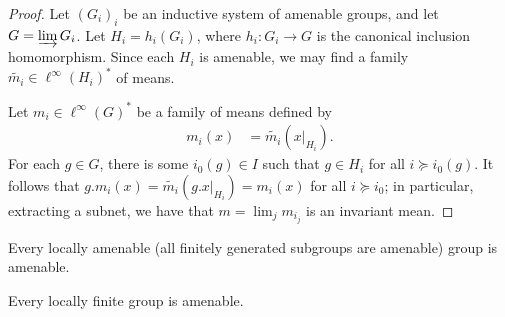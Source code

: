 \documentclass[10pt]{mypackage}
\begin{document}
\begin{proof}
  Let $\left( G_i \right)_i$ be an inductive system of amenable groups, and let $G = \varinjlim G_i$. Let $H_i = h_i\left( G_i \right)$, where $h_i\colon G_i\rightarrow G$ is the canonical inclusion homomorphism. Since each $H_i$ is amenable, we may find a family $ \widetilde{m_i}\in \ell^{\infty}\left( H_i \right)^{\ast} $ of means.

  Let $m_i\in \ell^{\infty}\left( G \right)^{\ast}$ be a family of means defined by
  \begin{align*}
    m_i\left( x \right) &= \widetilde{m_i}\left( x|_{H_i} \right).
  \end{align*}
  For each $g\in G$, there is some $i_0(g)\in I$ such that $g\in H_i$ for all $i\succeq i_0(g)$. It follows that $g.m_i(x) = \widetilde{m_i}\left( g.x|_{H_i} \right) = m_i\left(x\right)$ for all $i\succeq i_0$; in particular, extracting a subnet, we have that $m = \lim_{j}m_{i_j}$ is an invariant mean.
\end{proof}
\begin{corollary}
  Every locally amenable (all finitely generated subgroups are amenable) group is amenable.
\end{corollary}
\begin{corollary}
  Every locally finite group is amenable.
\end{corollary}
\end{document}
